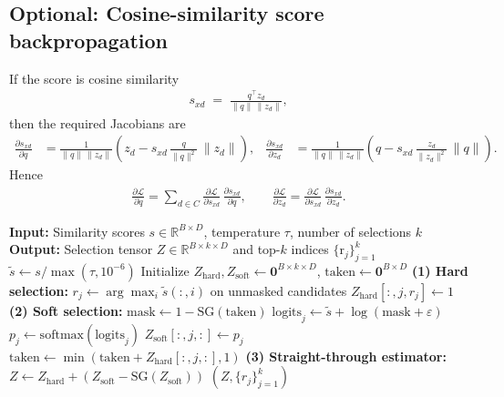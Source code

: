 \documentclass{applemlr}
\newcommand{\sd}{s_{xd}}
\numberwithin{equation}{section}
\begin{document}
\subsection*{Optional: Cosine-similarity score backpropagation}
If the score is cosine similarity
\begin{align}
\sd \;=\; \frac{q^\top z_d}{\|q\|\,\|z_d\|},
\end{align}
then the required Jacobians are
\begin{align}
\frac{\partial \sd}{\partial q}
&=
\frac{1}{\|q\|\,\|z_d\|}
\left(
z_d
-
\sd\,\frac{q}{\|q\|^2}\,\|z_d\|
\right),
&
\frac{\partial \sd}{\partial z_d}
&=
\frac{1}{\|q\|\,\|z_d\|}
\left(
q
-
\sd\,\frac{z_d}{\|z_d\|^2}\,\|q\|
\right).
\end{align}
Hence
\begin{align}
\frac{\partial \mathcal{L}}{\partial q}
=\sum_{d\in C}\frac{\partial \mathcal{L}}{\partial \sd}\,\frac{\partial \sd}{\partial q},
\qquad
\frac{\partial \mathcal{L}}{\partial z_d}
=\frac{\partial \mathcal{L}}{\partial \sd}\,\frac{\partial \sd}{\partial z_d}.
\end{align}

\begin{algorithm}[t]
\footnotesize
\caption{Differentiable Top-$k$ Selection with Straight-Through Estimator in CLaRA}
\label{alg:st_topk}
\begin{algorithmic}[1]
\State \textbf{Input:} Similarity scores $s \in \mathbb{R}^{B \times D}$, temperature $\tau$, number of selections $k$
\State \textbf{Output:} Selection tensor $Z \in \mathbb{R}^{B \times k \times D}$ and top-$k$ indices $\{\text{r}_j\}_{j=1}^k$
\vspace{2pt}
\State $\tilde{s} \gets s / \max(\tau, 10^{-6})$
\State Initialize $Z_{\text{hard}}, Z_{\text{soft}} \gets \mathbf{0}^{B\times k\times D}$, \; $\text{taken} \gets \mathbf{0}^{B\times D}$
    \State \textbf{(1) Hard selection:} 
        $r_j \gets \arg\max_i \tilde{s}(:, i)$ on unmasked candidates
    \State \hspace{2.5em} $Z_{\text{hard}}[:, j, r_j] \gets 1$
    \State \textbf{(2) Soft selection:}
        $\text{mask} \gets 1 - \mathrm{SG}(\text{taken})$
    \State \hspace{2.5em} $\text{logits}_j \gets \tilde{s} + \log(\text{mask} + \varepsilon)$
    \State \hspace{2.5em} $p_j \gets \mathrm{softmax}(\text{logits}_j)$
    \State \hspace{2.5em} $Z_{\text{soft}}[:, j, :] \gets p_j$
    \State \hspace{2.5em} $\text{taken} \gets \min(\text{taken} + Z_{\text{hard}}[:, j, :], 1)$
\EndFor
\State \textbf{(3) Straight-through estimator:} 
    $Z \gets Z_{\text{hard}} + (Z_{\text{soft}} - \mathrm{SG}(Z_{\text{soft}}))$
\State \Return $(Z, \{ r_j \}_{j=1}^k)$
\end{algorithmic}
\end{algorithm}
\end{document}
